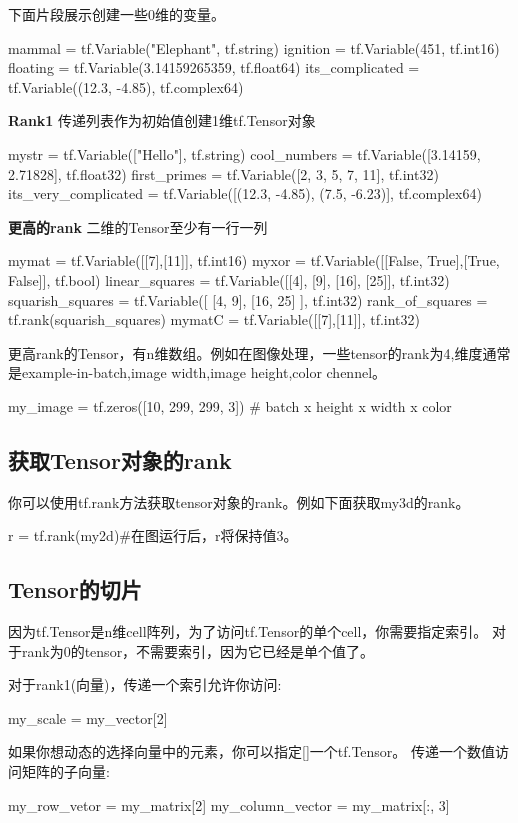 下面片段展示创建一些0维的变量。
\begin{python}
mammal = tf.Variable("Elephant", tf.string)
ignition = tf.Variable(451, tf.int16)
floating = tf.Variable(3.14159265359, tf.float64)
its_complicated = tf.Variable((12.3, -4.85), tf.complex64)
\end{python}
\textbf{Rank1}
传递列表作为初始值创建1维tf.Tensor对象
\begin{python}
mystr = tf.Variable(["Hello"], tf.string)
cool_numbers  = tf.Variable([3.14159, 2.71828], tf.float32)
first_primes = tf.Variable([2, 3, 5, 7, 11], tf.int32)
its_very_complicated = tf.Variable([(12.3, -4.85), (7.5, -6.23)], tf.complex64)
\end{python}
\textbf{更高的rank}
二维的Tensor至少有一行一列
\begin{python}
mymat = tf.Variable([[7],[11]], tf.int16)
myxor = tf.Variable([[False, True],[True, False]], tf.bool)
linear_squares = tf.Variable([[4], [9], [16], [25]], tf.int32)
squarish_squares = tf.Variable([ [4, 9], [16, 25] ], tf.int32)
rank_of_squares = tf.rank(squarish_squares)
mymatC = tf.Variable([[7],[11]], tf.int32)
\end{python}
更高rank的Tensor，有n维数组。例如在图像处理，一些tensor的rank为4,维度通常是example-in-batch,image width,image height,color chennel。
\begin{python}
my_image = tf.zeros([10, 299, 299, 3])  # batch x height x width x color
\end{python}
\subsection{获取Tensor对象的rank}
你可以使用tf.rank方法获取tensor对象的rank。例如下面获取my3d的rank。
\begin{python}
r = tf.rank(my2d)#在图运行后，r将保持值3。
\end{python}
\subsection{Tensor的切片}
因为tf.Tensor是n维cell阵列，为了访问tf.Tensor的单个cell，你需要指定索引。
对于rank为0的tensor，不需要索引，因为它已经是单个值了。\par
对于rank1(向量)，传递一个索引允许你访问:
\begin{python}
my_scale = my_vector[2]
\end{python}
如果你想动态的选择向量中的元素，你可以指定[]一个tf.Tensor。
传递一个数值访问矩阵的子向量:
\begin{python}
my_row_vetor = my_matrix[2]
my_column_vector = my_matrix[:, 3]
\end{python}
